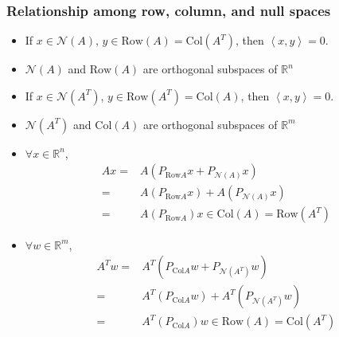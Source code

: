\documentclass[compress]{beamer}
\def\R{\mathbb{R}}
\newcommand{\iprod}[2]{\left\langle {#1} , {#2} \right\rangle}
\newcommand{\row}{\mathrm{Row}}
\newcommand{\col}{\mathrm{Col}}
\begin{document}
\begin{frame}[shrink]
  \frametitle{Relationship among row, column, and null
    spaces}
  \begin{itemize}
  \item If $x \in \mathcal{N}(A)$, $y \in \row(A) = \col(A^T)$, then
    $\iprod{x}{y} = 0$. 
  \item $\mathcal{N}(A)$ and $\row(A)$ are orthogonal subspaces of $\R^n$
  \item If $x \in \mathcal{N}(A^T)$, $y \in \row(A^T) = \col(A)$, then
    $\iprod{x}{y} = 0$. 
  \item $\mathcal{N}(A^T)$ and $\col(A)$ are orthogonal subspaces of
    $\R^m$
  \item $\forall x \in \R^n$, 
    \begin{align*}
      A x = & A (P_{\row{A}}x + P_{\mathcal{N}(A)} x)  \\
      = &  A (P_{\row{A}}x) + A (P_{\mathcal{N}(A)} x)  \\
      = & A (P_{\row{A}})x \in \col(A) = \row(A^T)
    \end{align*}
  \item $\forall w \in \R^m$,
    \begin{align*}
      A^T w = & A^T (P_{\col{A}}w + P_{\mathcal{N}(A^T)} w)  \\
      = &  A^T (P_{\col{A}}w) + A^T (P_{\mathcal{N}(A^T)} w) \\
      = & A^T (P_{\col{A}})w \in \row(A) = \col(A^T)
    \end{align*}    
  \end{itemize}
\end{frame}
\end{document}

